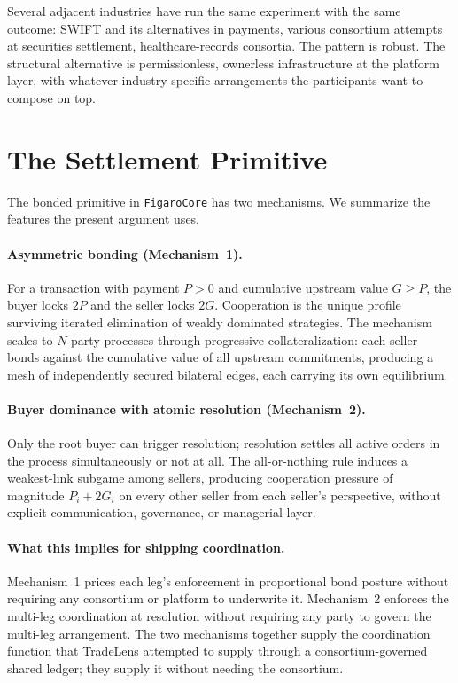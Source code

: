 \documentclass[11pt,a4paper]{article}
\theoremstyle{definition}
\theoremstyle{remark}
\newcommand{\pay}{P}
\newcommand{\cumval}{G}
\begin{document}
Several adjacent industries have run the same experiment with
the same outcome: SWIFT and its alternatives in payments,
various consortium attempts at securities settlement,
healthcare-records consortia. The pattern is robust. The
structural alternative is permissionless, ownerless infrastructure
at the platform layer, with whatever industry-specific arrangements
the participants want to compose on top.

\section{The Settlement Primitive}
\label{sec:primitive}

The bonded primitive in \texttt{FigaroCore} has two mechanisms.
We summarize the features the present argument uses.

\paragraph{Asymmetric bonding (Mechanism~1).}
For a transaction with payment $\pay > 0$ and cumulative upstream
value $\cumval \geq \pay$, the buyer locks $2\pay$ and the seller
locks $2\cumval$. Cooperation is the unique profile surviving
iterated elimination of weakly dominated strategies. The
mechanism scales to $N$-party processes through progressive
collateralization: each seller bonds against the cumulative value
of all upstream commitments, producing a mesh of independently
secured bilateral edges, each carrying its own equilibrium.

\paragraph{Buyer dominance with atomic resolution (Mechanism~2).}
Only the root buyer can trigger resolution; resolution settles all
active orders in the process simultaneously or not at all. The
all-or-nothing rule induces a weakest-link subgame among sellers,
producing cooperation pressure of magnitude $\pay_i + 2\cumval_i$
on every other seller from each seller's perspective, without
explicit communication, governance, or managerial layer.

\paragraph{What this implies for shipping coordination.}
Mechanism~1 prices each leg's enforcement in proportional bond
posture without requiring any consortium or platform to underwrite
it. Mechanism~2 enforces the multi-leg coordination at resolution
without requiring any party to govern the multi-leg arrangement.
The two mechanisms together supply the coordination function that
TradeLens attempted to supply through a consortium-governed shared
ledger; they supply it without needing the consortium.
\end{document}
